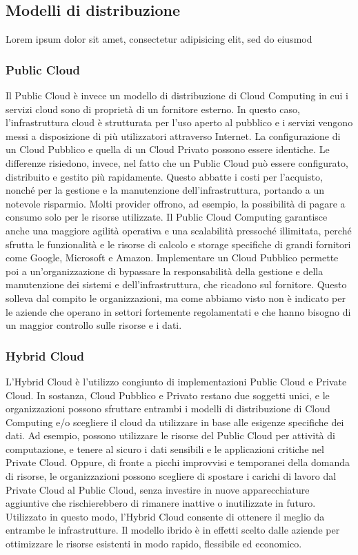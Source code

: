 \subsection{Modelli di distribuzione} %
Lorem ipsum dolor sit amet, consectetur adipisicing elit, sed do eiusmod

\subsubsection{Public Cloud}
Il Public Cloud è invece un modello di distribuzione di Cloud Computing in cui i servizi cloud sono di proprietà di un fornitore esterno. In questo caso, l’infrastruttura cloud è strutturata per l’uso aperto al pubblico e i servizi vengono messi a disposizione di più utilizzatori attraverso Internet.
La configurazione di un Cloud Pubblico e quella di un Cloud Privato possono essere identiche.
Le differenze risiedono, invece, nel fatto che un Public Cloud può essere configurato, distribuito e gestito più rapidamente. Questo abbatte i costi per l’acquisto, nonché per la gestione e la manutenzione dell’infrastruttura, portando a un notevole risparmio. Molti provider offrono, ad esempio, la possibilità di pagare a consumo solo per le risorse utilizzate.
Il Public Cloud Computing garantisce anche una maggiore agilità operativa e una scalabilità pressoché illimitata, perché sfrutta le funzionalità e le risorse di calcolo e storage specifiche di grandi fornitori come Google, Microsoft e Amazon.
Implementare un Cloud Pubblico permette poi a un’organizzazione di bypassare la responsabilità della gestione e della manutenzione dei sistemi e dell’infrastruttura, che ricadono sul fornitore. Questo solleva dal compito le organizzazioni, ma come abbiamo visto non è indicato per le aziende che operano in settori fortemente regolamentati e che hanno bisogno di un maggior controllo sulle risorse e i dati.

\subsubsection{Hybrid Cloud}
L’Hybrid Cloud è l’utilizzo congiunto di implementazioni Public Cloud e Private Cloud.
In sostanza, Cloud Pubblico e Privato restano due soggetti unici, e le organizzazioni possono sfruttare entrambi i modelli di distribuzione di Cloud Computing e/o scegliere il cloud da utilizzare in base alle esigenze specifiche dei dati.
Ad esempio, possono utilizzare le risorse del Public Cloud per attività di computazione, e tenere al sicuro i dati sensibili e le applicazioni critiche nel Private Cloud. Oppure, di fronte a picchi improvvisi e temporanei della domanda di risorse, le organizzazioni possono scegliere di spostare i carichi di lavoro dal Private Cloud al Public Cloud, senza investire in nuove apparecchiature aggiuntive che rischierebbero di rimanere inattive o inutilizzate in futuro.
Utilizzato in questo modo, l’Hybrid Cloud consente di ottenere il meglio da entrambe le infrastrutture.
Il modello ibrido è in effetti scelto dalle aziende per ottimizzare le risorse esistenti in modo rapido, flessibile ed economico.

